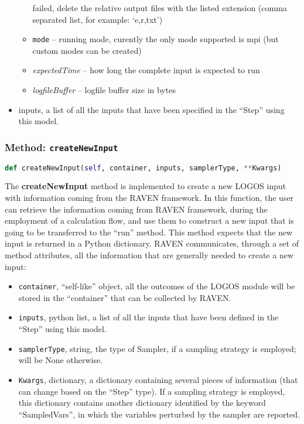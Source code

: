 \begin{itemize}
\begin{itemize}
    failed, delete the relative output files with the listed extension (comma
    separated list, for example: `e,r,txt')
    \item \texttt{mode} -- running mode, curently the only mode supported is
      mpi (but custom modes can be created)
    \item \textit{expectedTime} -- how long the complete input is expected to
    run
    \item \textit{logfileBuffer} -- logfile buffer size in bytes
  \end{itemize}
  \item inputs, a list of all the inputs that have been specified in the
  ``Step'' using this model.
\end{itemize}

\subsubsection{Method: \texttt{createNewInput}}
\label{subsubsec:externalCreateNewInputExternalModelPlugin}
\begin{lstlisting}[language=python]
  def createNewInput(self, container, inputs, samplerType, **Kwargs)
\end{lstlisting}
The \textbf{createNewInput} method is implemented to create a new LOGOS input
with information coming from the RAVEN framework. In this function, the user can
retrieve the information coming from RAVEN framework, during the employment of
a calculation flow, and use them to construct a new input that is going to be
transferred to the ``run'' method.
This method expects that the new input is returned in a Python dictionary.
RAVEN communicates, through a set of method attributes, all the information
that are generally needed to create a new input:

\begin{itemize}
  \item \texttt{container}, ``self-like'' object, all the outcomes of the LOGOS
    module will be stored in the ``container'' that can be collected by RAVEN.
  \item \texttt{inputs}, python list, a list of all the inputs that have been
    defined in the ``Step'' using this model.
  \item \texttt{samplerType}, string, the type of Sampler, if a sampling strategy
    is employed; will be None otherwise.
  \item \texttt{Kwargs}, dictionary, a dictionary containing several pieces of
    information (that can change based on the ``Step'' type). If a sampling strategy
    is employed, this dictionary contains another dictionary identified by the
    keyword ``SampledVars'', in which the variables perturbed by the sampler are reported.
\end{itemize}
